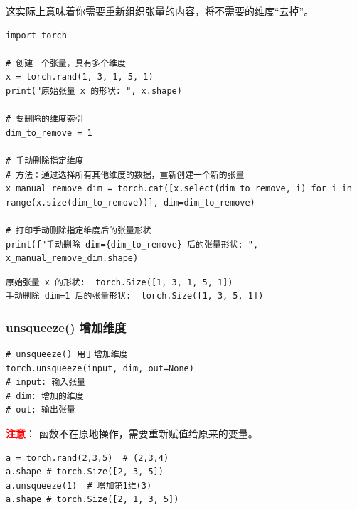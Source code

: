 这实际上意味着你需要重新组织张量的内容，将不需要的维度“去掉”。

\begin{lstlisting}[style=pythonstyle]
import torch

# 创建一个张量，具有多个维度
x = torch.rand(1, 3, 1, 5, 1)
print("原始张量 x 的形状: ", x.shape)

# 要删除的维度索引
dim_to_remove = 1

# 手动删除指定维度
# 方法：通过选择所有其他维度的数据，重新创建一个新的张量
x_manual_remove_dim = torch.cat([x.select(dim_to_remove, i) for i in range(x.size(dim_to_remove))], dim=dim_to_remove)

# 打印手动删除指定维度后的张量形状
print(f"手动删除 dim={dim_to_remove} 后的张量形状: ", x_manual_remove_dim.shape)
\end{lstlisting}
\begin{lstlisting}[style=demostyle,numbers=none]
原始张量 x 的形状:  torch.Size([1, 3, 1, 5, 1])
手动删除 dim=1 后的张量形状:  torch.Size([1, 3, 5, 1])
\end{lstlisting}    

\subsubsection{unsqueeze() 增加维度}
\label{subsubsec:Pytorch的unsqueeze()}
\begin{lstlisting}[style=demostyle,numbers=none]
# unsqueeze() 用于增加维度
torch.unsqueeze(input, dim, out=None)
# input: 输入张量
# dim: 增加的维度
# out: 输出张量
\end{lstlisting}

\textcolor{red}{\textbf{注意}}： 函数不在原地操作，需要重新赋值给原来的变量。

\begin{lstlisting}[style=pythonstyle]
a = torch.rand(2,3,5)  # (2,3,4)
a.shape # torch.Size([2, 3, 5])
a.unsqueeze(1)  # 增加第1维(3)
a.shape # torch.Size([2, 1, 3, 5])
\end{lstlisting}

